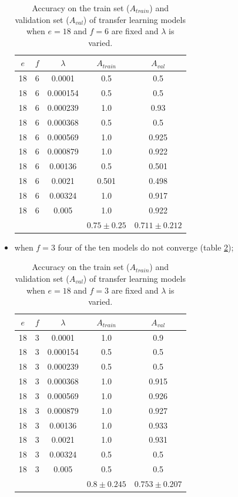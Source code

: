 \begin{itemize}
    \begin{table}[ht]
    \centering
    \begin{tabular}{ |c|c|c|c|c| }
    \hline
    $e$ & $f$ & $\lambda$ & $A_{train}$ & $A_{val}$ \\
    \hline
    18 & 6 & 0.0001 & 0.5 & 0.5 \\
    18 & 6 & 0.000154 & 0.5 & 0.5 \\
    18 & 6 & 0.000239 & 1.0 & 0.93 \\
    18 & 6 & 0.000368 & 0.5 & 0.5 \\
    18 & 6 & 0.000569 & 1.0 & 0.925 \\
    18 & 6 & 0.000879 & 1.0 & 0.922 \\
    18 & 6 & 0.00136 & 0.5 & 0.501 \\
    18 & 6 & 0.0021 & 0.501 & 0.498 \\
    18 & 6 & 0.00324 & 1.0 & 0.917 \\
    18 & 6 & 0.005 & 1.0 & 0.922 \\
    \hline
     & & & $0.75\pm0.25$ & $0.711\pm0.212$ \\
    \hline
    \end{tabular}
    \caption{Accuracy on the train set ($A_{train}$) and validation set ($A_{val}$) of transfer learning models when $e = 18$ and $f = 6$ are fixed and $\lambda$ is varied.}
    \label{table:vgg16_finetuning_6}
    \end{table}

    \item when $f = 3$ four of the ten models do not converge (table \ref{table:vgg16_finetuning_3});

    \begin{table}[ht]
    \centering
    \begin{tabular}{ |c|c|c|c|c| }
    \hline
    $e$ & $f$ & $\lambda$ & $A_{train}$ & $A_{val}$ \\
    \hline
    18 & 3 & 0.0001 & 1.0 & 0.9 \\
    18 & 3 & 0.000154 & 0.5 & 0.5 \\
    18 & 3 & 0.000239 & 0.5 & 0.5 \\
    18 & 3 & 0.000368 & 1.0 & 0.915 \\
    18 & 3 & 0.000569 & 1.0 & 0.926 \\
    18 & 3 & 0.000879 & 1.0 & 0.927 \\
    18 & 3 & 0.00136 & 1.0 & 0.933 \\
    18 & 3 & 0.0021 & 1.0 & 0.931 \\
    18 & 3 & 0.00324 & 0.5 & 0.5 \\
    18 & 3 & 0.005 & 0.5 & 0.5 \\
    \hline
     & & & $0.8\pm0.245$ & $0.753\pm0.207$ \\
    \hline
    \end{tabular}
    \caption{Accuracy on the train set ($A_{train}$) and validation set ($A_{val}$) of transfer learning models when $e = 18$ and $f = 3$ are fixed and $\lambda$ is varied.}
    \label{table:vgg16_finetuning_3}
    \end{table}


\end{itemize}
